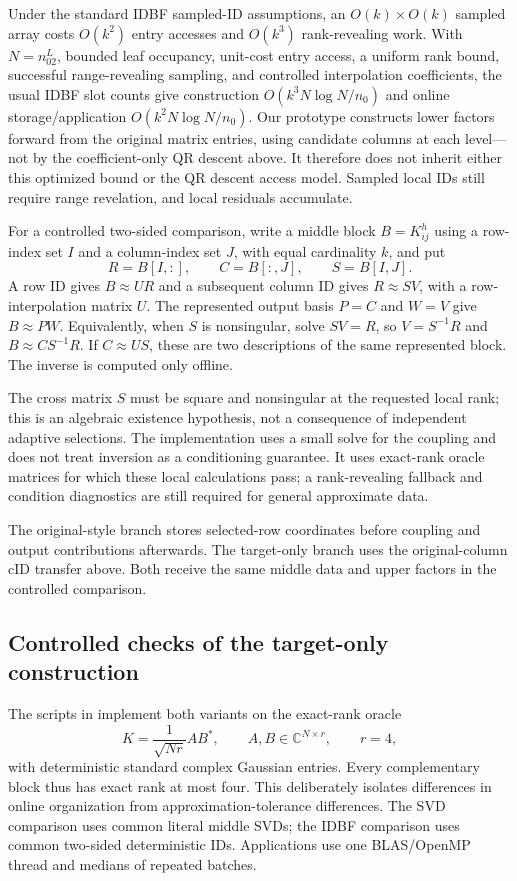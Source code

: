 \documentclass[11pt,a4paper]{article}
\begin{document}
Under the standard IDBF sampled-ID assumptions, an $O(k)\times O(k)$ sampled array costs $O(k^2)$ entry accesses and $O(k^3)$ rank-revealing work. With $N=n_02^L$, bounded leaf occupancy, unit-cost entry access, a uniform rank bound, successful range-revealing sampling, and controlled interpolation coefficients, the usual IDBF slot counts give construction $O(k^3N\log N/n_0)$ and online storage/application $O(k^2N\log N/n_0)$. Our prototype constructs lower factors forward from the original matrix entries, using candidate columns at each level---not by the coefficient-only QR descent above. It therefore does not inherit either this optimized bound or the QR descent access model. Sampled local IDs still require range revelation, and local residuals accumulate.

For a controlled two-sided comparison, write a middle block $B=K_{ij}^h$ using a row-index set $I$ and a column-index set $J$, with equal cardinality $k$, and put
\[
 R=B[I,:],\qquad C=B[:,J],\qquad S=B[I,J].
\]
A row ID gives $B\approx UR$ and a subsequent column ID gives $R\approx SV$, with a row-interpolation matrix $U$. The represented output basis $P=C$ and $W=V$ give $B\approx PW$. Equivalently, when $S$ is nonsingular, solve $SV=R$, so $V=S^{-1}R$ and $B\approx CS^{-1}R$. If $C\approx US$, these are two descriptions of the same represented block. The inverse is computed only offline.

The cross matrix $S$ must be square and nonsingular at the requested local rank; this is an algebraic existence hypothesis, not a consequence of independent adaptive selections. The implementation uses a small solve for the coupling and does not treat inversion as a conditioning guarantee. It uses exact-rank oracle matrices for which these local calculations pass; a rank-revealing fallback and condition diagnostics are still required for general approximate data.

The original-style branch stores selected-row coordinates before coupling and output contributions afterwards. The target-only branch uses the original-column cID transfer above. Both receive the same middle data and upper factors in the controlled comparison.

\subsection{Controlled checks of the target-only construction}
\label{sec:target-only-checks}
The scripts in  implement both variants on the exact-rank oracle
\[
 K=\frac1{\sqrt{Nr}}AB^*,
 \qquad A,B\in\mathbb C^{N\times r},\qquad r=4,
\]
with deterministic standard complex Gaussian entries. Every complementary block thus has exact rank at most four. This deliberately isolates differences in online organization from approximation-tolerance differences. The SVD comparison uses common literal middle SVDs; the IDBF comparison uses common two-sided deterministic IDs. Applications use one BLAS/OpenMP thread and medians of repeated batches.
\end{document}
